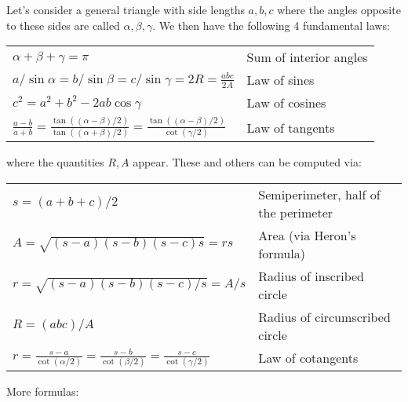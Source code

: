 \medskip
Let's consider a general triangle with side lengths $a,b,c$ where the angles opposite to these sides are called $\alpha, \beta, \gamma$. We then have the following 4 fundamental laws:

\medskip
\begin{tabular}{l l}
  $\alpha + \beta + \gamma = \pi$                       & Sum of interior angles \\
  $a / \sin \alpha = b / \sin \beta 
    = c / \sin \gamma 
    = 2R = \frac{abc}{2 A}$                             & Law of sines \\  
  $c^2 = a^2 + b^2 - 2ab \cos \gamma$                   & Law of cosines \\
  $\frac{a-b}{a+b} 
   = \frac{\tan((\alpha-\beta)/2)}{\tan ((\alpha+\beta)/2)} 
   = \frac{\tan((\alpha-\beta)/2)}{\cot (\gamma/2)}$
                                                        & Law of tangents \\
\end{tabular}
\medskip

where the quantities $R, A$ appear. These and others can be computed via:

\medskip
\begin{tabular}{l l}
 $s = (a+b+c)/2$                       & Semiperimeter, half of the perimeter \\
 $A = \sqrt{(s-a)(s-b)(s-c) s} = r s$  & Area (via Heron's formula) \\
 $r = \sqrt{(s-a)(s-b)(s-c)/s} = A/s$  & Radius of inscribed circle \\  
 $R = (abc)/ A$                        & Radius of circumscribed circle \\
 $r = \frac{s-a}{\cot(\alpha/2)}
    = \frac{s-b}{\cot(\beta/2)}
    = \frac{s-c}{\cot(\gamma/2)}$      & Law of cotangents\\
\end{tabular}
\medskip

More formulas:

